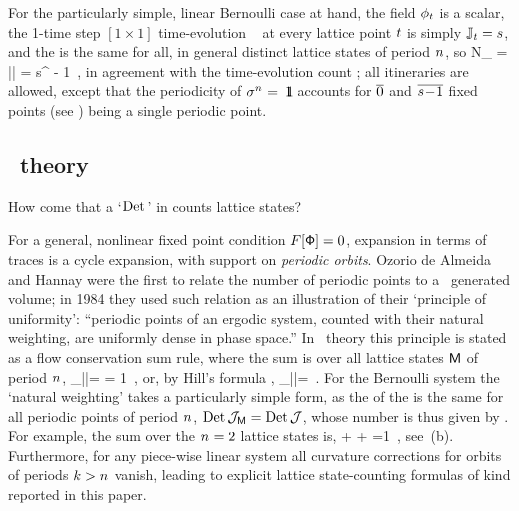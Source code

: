 For the particularly simple, linear {Bernoulli} case at hand,
the field $\phi_{t}$ is a scalar,
the 1-time step $[1\!\times\!1]$ time-evolution \jacobianM\
 at every lattice point $t$ is simply
$\mathbb{J}_{t}={s}$,
and
the {\jacobianOrb}
 is the same for all, in general
distinct lattice states of period ${n_{}}$,
so
\beq
N_\cl{} = |\Det\jMorb| = {s}^{\cl{}} - 1
\,,
in agreement with the time-evolution count ; all
itineraries are allowed, except that the periodicity of
$\hopMat^\cl{}=\id$ accounts for $\cycle{0}$ and
$\cycle{s\!-\!1}$ fixed points (see ) being a
single periodic point.



\subsection{\Po\ theory}
\label{s:PoThe}

How come that a `$\Det$' in  counts lattice states?

For a general, nonlinear fixed point condition $F[\Xx]=0$, expansion
\refeq{LnDet=TrLn2} in terms of traces is a cycle
expansion, with support on \emph{periodic orbits}.
Ozorio de Almeida and Hannay\rf{OzoHan84} were the first to relate the
number of periodic points to a \JacobianM\ generated volume; in 1984 they
used such relation as an illustration of their `principle of uniformity':
``periodic points of an ergodic system, counted with their natural
weighting, are uniformly dense in phase space.'' In \po\
theory this principle is stated as a
 {flow
conservation} sum rule, where the sum is over all lattice states $\Mm$ of
period $\cl{}$,
\beq
\sum_{|\Mm|=\cl{}}
    \;= 1
\,,
\label{H-OdeA_mapsOrb}
\eeq
or, by Hill's formula ,
\beq
\sum_{|\Mm|=\cl{}}
    \;=1
\,.
\label{Det(jMorb)eights}
\eeq
For the Bernoulli system the `natural weighting' takes a particularly
simple form, as the {\HillDet} of the {\jacobianOrb} is the same for all
periodic points of period ${n_{}}$, $\mbox{\rm Det}\,{\mathcal{J}}_{\mathsf{M}}=\mbox{\rm Det}\,{\mathcal{J}}$, whose
number is thus given by \refeq{detBern0}.
For example, the sum over the ${n_{}}=2$ lattice states is,
\beq
   +    
   + \frac{1}{|\Det{\color{yellow}\jMorb_{10}}|}
    =1
\,,
see \,(b).
Furthermore, for any piece-wise
linear system all curvature corrections for orbits of
periods $k>{n_{}}$ vanish, leading to explicit lattice state-counting
formulas of kind reported in this paper.

